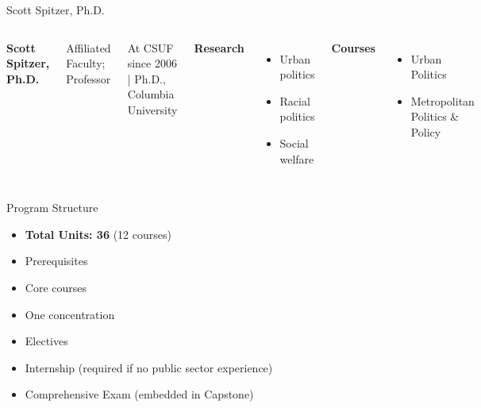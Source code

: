 \documentclass[10pt]{beamer}
\newlength{\imageheight}
\begin{document}
\begin{frame}{Scott Spitzer, Ph.D.}
\begin{columns}[T,onlytextwidth]
    \raggedright
    {\large\bfseries Scott Spitzer, Ph.D.}\par
    {Affiliated Faculty; Professor}\par
    {\footnotesize At CSUF since 2006 \quad | \quad Ph.D., Columbia University}\par\vspace{0.4em}

    \textbf{Research}
    \begin{itemize}
      \item Urban politics
      \item Racial politics
      \item Social welfare
    \end{itemize}

    \textbf{Courses}
    \begin{itemize}
      \item Urban Politics
      \item Metropolitan Politics \& Policy
    \end{itemize}

    \vspace*{0.25cm}
    \includegraphics[height=\imageheight]{images/spitzer.png}
\end{columns}
\end{frame}

\begin{frame}{Program Structure}
\begin{itemize}
  \item \textbf{Total Units: 36} (12 courses)
  \item Prerequisites
  \item Core courses
  \item One concentration
  \item Electives
  \item Internship (required if no public sector experience)
  \item Comprehensive Exam (embedded in Capstone)
\end{itemize}
\end{frame}
\end{document}
